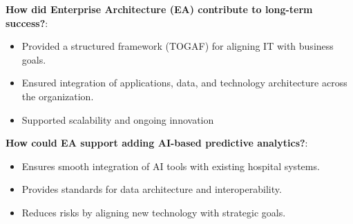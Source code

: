 \bigskip

\noindent\textbf{How did Enterprise Architecture (EA) contribute to long-term success?}:

\begin{itemize}
    \item Provided a structured framework (TOGAF) for aligning IT with business goals.
    \item Ensured integration of applications, data, and technology architecture across the organization.
    \item Supported scalability and ongoing innovation
\end{itemize}

\bigskip

\noindent\textbf{How could EA support adding AI-based predictive analytics?}:

\begin{itemize}
    \item Ensures smooth integration of AI tools with existing hospital systems.
    \item Provides standards for data architecture and interoperability.
    \item Reduces risks by aligning new technology with strategic goals.
\end{itemize}